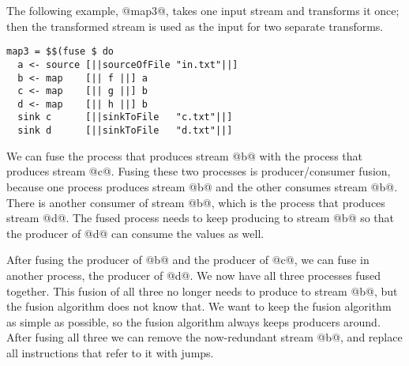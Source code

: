 The following example, @map3@, takes one input stream and transforms it once; then the transformed stream is used as the input for two separate transforms.

\begin{lstlisting}
map3 = $$(fuse $ do
  a <- source [||sourceOfFile "in.txt"||]
  b <- map    [|| f ||] a
  c <- map    [|| g ||] b
  d <- map    [|| h ||] b
  sink c      [||sinkToFile   "c.txt"||]
  sink d      [||sinkToFile   "d.txt"||]
\end{lstlisting}

We can fuse the process that produces stream @b@ with the process that produces stream @c@.
Fusing these two processes is producer/consumer fusion, because one process produces stream @b@ and the other consumes stream @b@.
There is another consumer of stream @b@, which is the process that produces stream @d@.
The fused process needs to keep producing to stream @b@ so that the producer of @d@ can consume the values as well.

After fusing the producer of @b@ and the producer of @c@, we can fuse in another process, the producer of @d@.
We now have all three processes fused together.
This fusion of all three no longer needs to produce to stream @b@, but the fusion algorithm does not know that.
We want to keep the fusion algorithm as simple as possible, so the fusion algorithm always keeps producers around.
After fusing all three we can remove the now-redundant stream @b@, and replace all instructions that refer to it with jumps.





